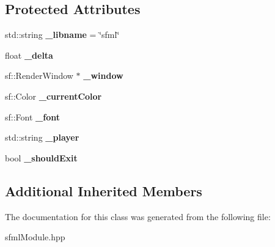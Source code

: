 \subsection*{Protected Attributes}
\begin{DoxyCompactItemize}
\item 
\mbox{\label{class_sfml_module_ad18b00c92d018b50718969c61fbf1bf5}} 
std\+::string {\bfseries \+\_\+libname} = \char`\"{}sfml\char`\"{}
\item 
\mbox{\label{class_sfml_module_a124067d6f0aca990ca955d334cdc57b7}} 
float {\bfseries \+\_\+delta}
\item 
\mbox{\label{class_sfml_module_acdf63c837b17609e74ec52103fcb0715}} 
sf\+::\+Render\+Window $\ast$ {\bfseries \+\_\+window}
\item 
\mbox{\label{class_sfml_module_a0ee320375656c09f944b0926927598d9}} 
sf\+::\+Color {\bfseries \+\_\+current\+Color}
\item 
\mbox{\label{class_sfml_module_a95dc94d1a3337013089e6b8ae2eee99e}} 
sf\+::\+Font {\bfseries \+\_\+font}
\item 
\mbox{\label{class_sfml_module_ab96e84bb73782650b587ab731d36eefa}} 
std\+::string {\bfseries \+\_\+player}
\item 
\mbox{\label{class_sfml_module_a75e30e380ae44dde1f5de7be734e30de}} 
bool {\bfseries \+\_\+should\+Exit}
\end{DoxyCompactItemize}
\subsection*{Additional Inherited Members}


The documentation for this class was generated from the following file\+:\begin{DoxyCompactItemize}
\item 
sfml\+Module.\+hpp\end{DoxyCompactItemize}

